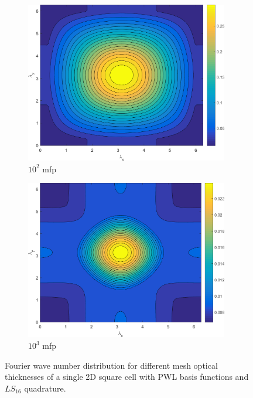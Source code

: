 \begin{figure}
{\begin{subfigure}[b]{0.485\textwidth}
		\centering
		\includegraphics[width=0.975\textwidth]{figures/sec_DSA/SI_MIP_C=4_UPWLD1_LS16_x=100_dydx=1_contour.png}
		\caption{$10^{2}$ mfp}
	\end{subfigure}
	\hfill
	\begin{subfigure}[b]{0.485\textwidth}
		\centering
		\includegraphics[width=0.975\textwidth]{figures/sec_DSA/SI_MIP_C=4_UPWLD1_LS16_x=1000_dydx=1_contour.png}
		\caption{$10^{3}$ mfp}
	\end{subfigure}
	}
\caption{Fourier wave number distribution for different mesh optical thicknesses of a single 2D square cell with PWL basis functions and $LS_{16}$ quadrature.}
\label{fig::2D_homo_dsa_wave_LS16}
\end{figure}


